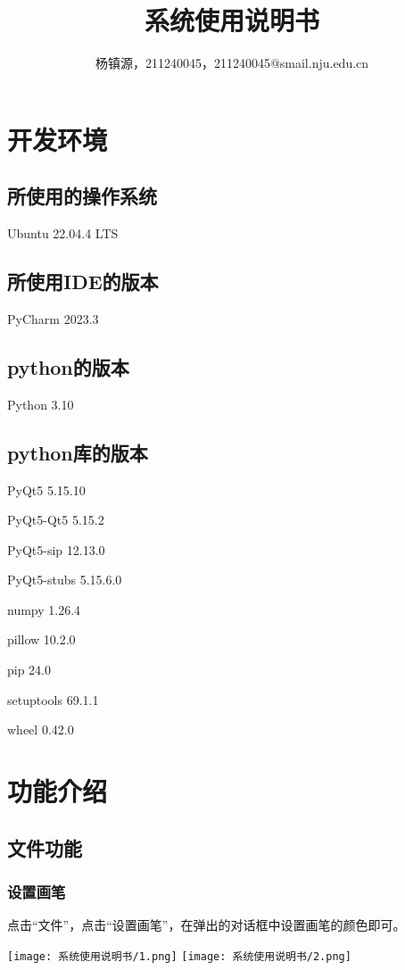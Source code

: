 \documentclass{article}
\title{系统使用说明书}
\author{杨镇源，211240045，211240045@smail.nju.edu.cn}
\begin{document}
	\maketitle
	\tableofcontents 
	\newpage
	\section{开发环境}
	\subsection{所使用的操作系统}
	Ubuntu 22.04.4 LTS
	
	\subsection{所使用IDE的版本}
	PyCharm 2023.3
	
	\subsection{python的版本}
	Python 3.10
	
	\subsection{python库的版本}
	PyQt5 5.15.10
	
	PyQt5-Qt5 5.15.2
	
	PyQt5-sip 12.13.0
	
	PyQt5-stubs 5.15.6.0
	
	numpy 1.26.4
	
	pillow 10.2.0
	
	pip 24.0
	
	setuptools 69.1.1
	
	wheel 0.42.0
	
	\section{功能介绍}
		\subsection{文件功能}
		\subsubsection{设置画笔}
		点击“文件”，点击“设置画笔”，在弹出的对话框中设置画笔的颜色即可。
		\begin{center}
			\texttt{[image: 系统使用说明书/1.png]}
			\texttt{[image: 系统使用说明书/2.png]}
		\end{center}
	
\end{document}

